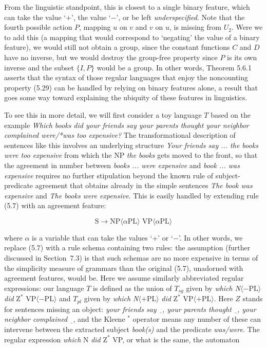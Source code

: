 \smallskip\noindent From the linguistic standpoint, this is closest to a
single binary feature, which can take the value `$+$', the value `$-$', or be
left {\it underspecified}. Note that the fourth
possible action $P$, mapping $u$ on $v$ and $v$ on $u$, is missing from $U_2$.
Were we to add this (a mapping that would correspond to `negating' the value
of a binary feature), we would still not obtain a group, since the constant
functions $C$ and $D$ have no inverse, but we would destroy the group-free
property since $P$ is its own inverse and the subset $\{I,P\}$ would be a
group. In other words, Theorem 5.6.1 asserts that the syntax of those regular
languages that enjoy the noncounting property (5.29) can be handled by relying
on binary features alone, a result that goes some way toward explaining the
ubiquity of these features in linguistics.

To see this in more detail, we will first consider a toy language $T$ based on
the example {\it Which books did your friends say your parents thought your
  neighbor complained were/*was too expensive?} The transformational
description of sentences like this involves an underlying structure {\it Your
  friends say ... the books were too expensive} from which the NP {\it the
  books} gets moved to the front, so that the agreement in number between {\it
  books ... were expensive} and {\it book ... was expensive} requires no
further stipulation beyond the known rule of subject-predicate agreement that
obtains already in the simple sentences {\it The book was expensive} and {\it
  The books were expensive}. This is easily handled by extending rule (5.7) 
with an agreement feature: 

\begin {equation}
\mbox{S} \rightarrow \text{NP}\langle \alpha \text{PL}\rangle \text{ VP}\langle
\alpha \text{PL}\rangle
\end{equation} 

\noindent 
where $\alpha$ is a variable that can take the values `+' or `$-$'. In other
words, we replace (5.7) with a rule schema containing two rules: the
assumption (further discussed in Section~7.3) is that such schemas are no more
expensive in terms of the simplicity measure of grammars than the original
(5.7), unadorned with agreement features, would be. Here we assume similarly
abbreviated regular expressions: our language $T$ is defined as the union of
$T_{sg}$ given by {\it which N}$\langle -\text{PL}\rangle$ {\it did}
$\text{Z}^*$ VP$\langle -\text{PL}\rangle$ and $T_{pl}$ given by {\it which
  N}$\langle +\text{PL}\rangle$ {\it did} $\text{Z}^*$ VP$\langle
+\text{PL}\rangle$. Here $Z$ stands for sentences missing an object: {\it your
  friends say $\underline{\ \ }$, your parents thought $\underline{\ \ }$,
  your neighbor complained $\underline{\ \ }$}, and the Kleene $^*$ operator
means any number of these can intervene between the extracted subject {\it
  book(s)} and the predicate {\it was/were}. The regular expression {\it
  which} N {\it did} $\text{Z}^*$ VP, or what is the same, the automaton

